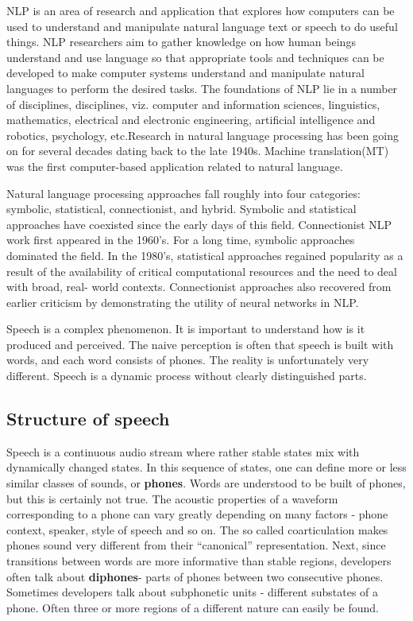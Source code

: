\documentclass[12pt,a4paper,oldfontcommands]{memoir}
\begin{document}
NLP is an area of research and application that explores how computers can be used to understand and manipulate natural language text or speech to do useful things. NLP researchers aim to gather knowledge on how human beings understand and use language so that appropriate tools and techniques can be developed to make computer systems understand and manipulate natural languages to perform the desired tasks. The foundations of NLP lie in a number of disciplines, disciplines, viz. computer and information sciences, linguistics, mathematics, electrical and electronic engineering, artificial intelligence and robotics, psychology, etc.Research in natural language processing has been going on for several decades dating back to the late 1940s. Machine translation(MT) was the first computer-based application related to natural language.

Natural language processing approaches fall roughly into four categories: symbolic, statistical, connectionist, and hybrid. Symbolic and statistical approaches have coexisted since the early days of this field. Connectionist NLP work first appeared in the 1960’s. For a long time, symbolic approaches dominated the field. In the 1980’s, statistical approaches regained popularity as a result of the availability of critical computational resources and the need to deal with broad, real- world contexts. Connectionist approaches also recovered from earlier criticism by demonstrating the utility of neural networks in NLP.

Speech is a complex phenomenon. It is important to  understand how is it produced and perceived. The naive perception is often that speech is built with words, and each word consists of phones. The reality is unfortunately very different. Speech is a dynamic process without clearly distinguished parts.

\subsection{Structure of speech}
Speech is a continuous audio stream where rather stable states mix with dynamically changed states. In this sequence of states, one can define more or less similar classes of sounds, or \textbf{phones}. Words are understood to be built of phones, but this is certainly not true. The acoustic properties of a waveform corresponding to a phone can vary greatly depending on many factors - phone context, speaker, style of speech and so on. The so called coarticulation makes phones sound very different from their “canonical” representation. Next, since transitions between words are more informative than stable regions, developers often talk about \textbf{diphones}- parts of phones between two consecutive phones. Sometimes developers talk about subphonetic units - different substates of a phone. Often three or more regions of a different nature can easily be found.
\end{document}
